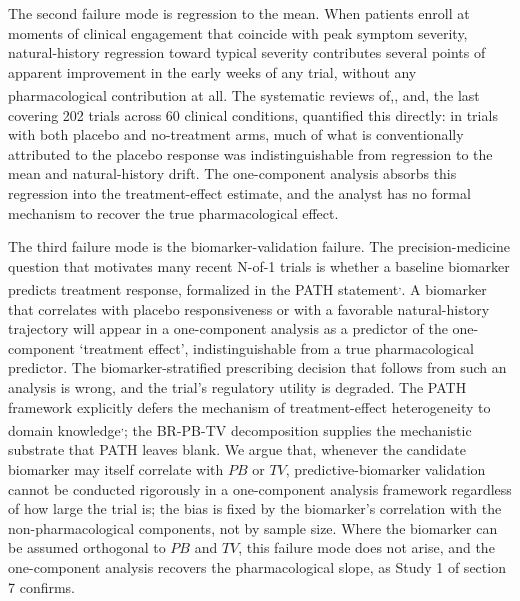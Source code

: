 \documentclass[
  11pt,
]{article}
\begin{document}
The second failure mode is regression to the mean. When patients enroll at
moments of clinical engagement that coincide with peak symptom severity,
natural-history regression toward typical severity contributes several points
of apparent improvement in the early weeks of any trial, without any
pharmacological contribution at all. The systematic reviews of\textsuperscript{},\textsuperscript{}, and\textsuperscript{}, the last covering
202 trials across 60 clinical conditions, quantified this directly: in trials
with both placebo and no-treatment arms, much of what is conventionally
attributed to the placebo response was indistinguishable from regression to
the mean and natural-history drift. The one-component analysis absorbs this
regression into the treatment-effect estimate, and the analyst has no formal
mechanism to recover the true pharmacological effect.

The third failure mode is the biomarker-validation failure. The
precision-medicine question that motivates many recent N-of-1 trials is
whether a baseline biomarker predicts treatment response, formalized in the
PATH statement\textsuperscript{,}. A biomarker that correlates
with placebo responsiveness or with a favorable natural-history trajectory
will appear in a one-component analysis as a predictor of the one-component
`treatment effect', indistinguishable from a true pharmacological predictor.
The biomarker-stratified prescribing decision that follows from such an
analysis is wrong, and the trial's regulatory utility is degraded. The PATH
framework explicitly defers the mechanism of treatment-effect heterogeneity to
domain knowledge\textsuperscript{,}; the BR-PB-TV
decomposition supplies the mechanistic substrate that PATH leaves blank. We
argue that, whenever the candidate biomarker may itself correlate with \(PB\) or
\(TV\), predictive-biomarker validation cannot be conducted rigorously in a
one-component analysis framework regardless of how large the trial is; the
bias is fixed by the biomarker's correlation with the non-pharmacological
components, not by sample size. Where the biomarker can be assumed orthogonal
to \(PB\) and \(TV\), this failure mode does not arise, and the one-component
analysis recovers the pharmacological slope, as Study 1 of section 7
confirms.
\end{document}
